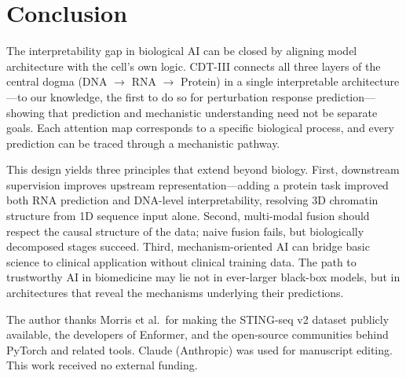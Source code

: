 \documentclass{article}
\begin{document}
\vspace{-2mm}
\section{Conclusion}
\vspace{-2mm}
The interpretability gap in biological AI can be closed by aligning model architecture with the cell's own logic. CDT-III connects all three layers of the central dogma (DNA $\to$ RNA $\to$ Protein) in a single interpretable architecture---to our knowledge, the first to do so for perturbation response prediction---showing that prediction and mechanistic understanding need not be separate goals. Each attention map corresponds to a specific biological process, and every prediction can be traced through a mechanistic pathway.

This design yields three principles that extend beyond biology. First, downstream supervision improves upstream representation---adding a protein task improved both RNA prediction and DNA-level interpretability, resolving 3D chromatin structure from 1D sequence input alone. Second, multi-modal fusion should respect the causal structure of the data; naive fusion fails, but biologically decomposed stages succeed. Third, mechanism-oriented AI can bridge basic science to clinical application without clinical training data. The path to trustworthy AI in biomedicine may lie not in ever-larger black-box models, but in architectures that reveal the mechanisms underlying their predictions.

\begin{ack}
The author thanks Morris et al.\ for making the STING-seq v2 dataset publicly available, the developers of Enformer, and the open-source communities behind PyTorch and related tools. Claude (Anthropic) was used for manuscript editing. This work received no external funding.
\end{ack}


\end{document}
